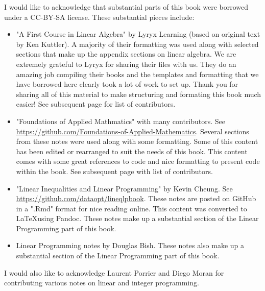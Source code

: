 I would like to acknowledge that substantial parts of this book were borrowed under a CC-BY-SA license.   These substantial pieces include:
\begin{itemize}
\item "A First Course in Linear Algebra" by Lyryx Learning (based on original text by Ken Kuttler).   A majority of their formatting was used along with selected sections that make up the appendix sections on linear algebra. We are extremely grateful to Lyryx for sharing their files with us.  They do an amazing job compiling their books and the templates and formatting that we have borrowed here clearly took a lot of work to set up.  Thank you for sharing all of this material to make structuring and formating this book much easier! See subsequent page for list of contributors.
\item "Foundations of Applied Mathmatics" with many contributors.  See \url{https://github.com/Foundations-of-Applied-Mathematics}.  Several sections from these notes were used along with some formatting.  Some of this content has been edited or rearranged to suit the needs of this book.  This content comes with some great references to code and nice formatting to present code within the book.   See subsequent page with list of contributors.
\item "Linear Inequalities and Linear Programming" by 
Kevin Cheung.  See \url{https://github.com/dataopt/lineqlpbook}.  These notes are posted on GitHub in a ".Rmd" format for nice reading online.  This content was converted to \LaTeX using Pandoc.    These notes make up a substantial section of the Linear Programming part of this book.
\item Linear Programming notes by Douglas Bish.  These notes also make up a substantial section of the Linear Programming part of this book.
\end{itemize}

I would also like to acknowledge Laurent Porrier and Diego Moran for contributing various notes on linear and integer programming.   


\newpage



